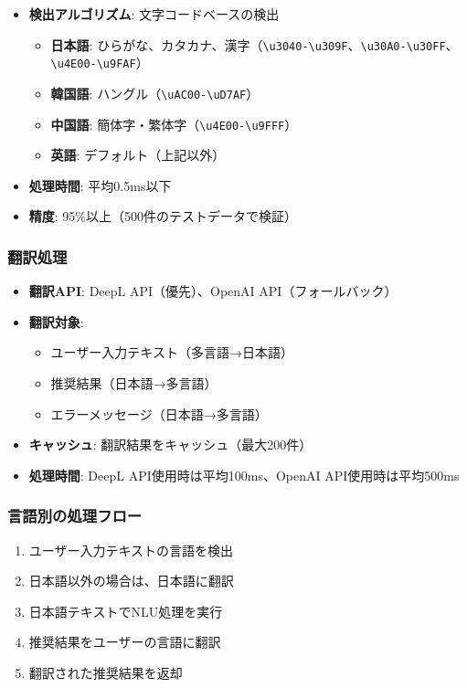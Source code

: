\documentclass[a4paper,11pt,ja=standard,xelatex]{bxjsarticle}
\theoremstyle{definition}
\begin{document}
\begin{itemize}
\item \textbf{検出アルゴリズム}: 文字コードベースの検出
  \begin{itemize}
  \item \textbf{日本語}: ひらがな、カタカナ、漢字（\texttt{\textbackslash u3040-\textbackslash u309F}、\texttt{\textbackslash u30A0-\textbackslash u30FF}、\texttt{\textbackslash u4E00-\textbackslash u9FAF}）
  \item \textbf{韓国語}: ハングル（\texttt{\textbackslash uAC00-\textbackslash uD7AF}）
  \item \textbf{中国語}: 簡体字・繁体字（\texttt{\textbackslash u4E00-\textbackslash u9FFF}）
  \item \textbf{英語}: デフォルト（上記以外）
  \end{itemize}
\item \textbf{処理時間}: 平均0.5ms以下
\item \textbf{精度}: 95\%以上（500件のテストデータで検証）
\end{itemize}

\subsubsection{翻訳処理}

\begin{itemize}
\item \textbf{翻訳API}: DeepL API（優先）、OpenAI API（フォールバック）
\item \textbf{翻訳対象}: 
  \begin{itemize}
  \item ユーザー入力テキスト（多言語→日本語）
  \item 推奨結果（日本語→多言語）
  \item エラーメッセージ（日本語→多言語）
  \end{itemize}
\item \textbf{キャッシュ}: 翻訳結果をキャッシュ（最大200件）
\item \textbf{処理時間}: DeepL API使用時は平均100ms、OpenAI API使用時は平均500ms
\end{itemize}

\subsubsection{言語別の処理フロー}

\begin{enumerate}
\item ユーザー入力テキストの言語を検出
\item 日本語以外の場合は、日本語に翻訳
\item 日本語テキストでNLU処理を実行
\item 推奨結果をユーザーの言語に翻訳
\item 翻訳された推奨結果を返却
\end{enumerate}
\end{document}
